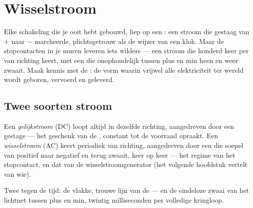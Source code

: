 \chapter{Wisselstroom}\label{ch:g9:alternating-current}

Elke schakeling die je ooit hebt gebouwd, liep op een
: een stroom die gestaag van $+$ naar $-$ marcheerde,
plichtsgetrouw als de wijzer van een klok. Maar de stopcontacten in je
muren leveren iets wilders --- een stroom die honderd keer per 
van richting keert, met een  die onophoudelijk tussen plus
en min heen en weer zwaait. Maak kennis met de
: de vorm waarin vrijwel alle elektriciteit ter
wereld wordt geboren, vervoerd en geleverd.

\section{Twee soorten stroom}

\begin{definition}\label{def:g9:alternating-current:dcac}
Een \emph{gelijkstroom} (DC) loopt altijd in
dezelfde richting, aangedreven door een gestage
 --- het geschenk van de ,
constant tot de voorraad opraakt. Een
\emph{wisselstroom} (AC) keert periodiek van
richting, aangedreven door een  die soepel van positief
naar negatief en terug zwaait, keer op keer --- het regime van het
stopcontact, en dat van de wisselstroomgenerator (het volgende
hoofdstuk vertelt van wie).
\end{definition}

\begin{omfigure}

{\small Twee  tegen de tijd: de vlakke, trouwe lijn van de
 --- en de eindeloze zwaai van het lichtnet tussen plus
en min, twintig milliseconden per volledige kringloop.}
\end{omfigure}

